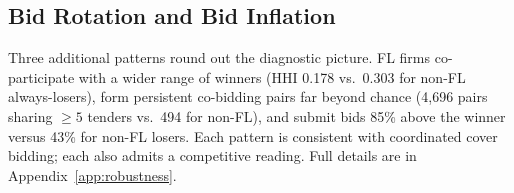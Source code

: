 
\subsection{Bid Rotation and Bid Inflation}
\label{sec:bid_rotation}

Three additional patterns round out the diagnostic picture. FL firms
co-participate with a wider range of winners (HHI 0.178 vs.\ 0.303
for non-FL always-losers), form persistent co-bidding pairs far
beyond chance (4,696 pairs sharing $\geq 5$ tenders vs.\ 494 for
non-FL), and submit bids 85\% above the winner versus 43\% for
non-FL losers. Each pattern is consistent with coordinated cover
bidding; each also admits a competitive reading. Full details are
in Appendix~\ref{app:robustness}.
